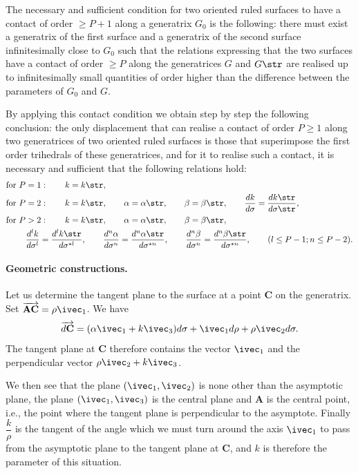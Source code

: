 The necessary and sufficient condition for two oriented ruled surfaces to have a contact of order $\ge P+1$ along a generatrix $G_{0}$ is the following: there must exist a generatrix of the first surface and a generatrix of the second surface infinitesimally close to $G_{0}$ such that the relations expressing that the two surfaces have a contact of order $\ge P$ along the generatrices $G$ and $G\str$ are realised up to infinitesimally small quantities of order higher than the difference between the parameters of $G_{0}$ and $G$.

By applying this contact condition we obtain step by step the following conclusion: the only displacement that can realise a contact of order $P\ge 1$ along two generatrices of two oriented ruled surfaces is those that superimpose the first order trihedrals of these generatrices, and for it to realise such a contact, it is necessary and sufficient that the following relations hold:
\begin{align*}
  \text{for }P&=1:\qquad k=k\str,\\
  \text{for }P&=2:\qquad k=k\str,\qquad\alpha=\alpha\str,\qquad\beta=\beta\str,\qquad\frac{dk}{d\sigma}=\frac{dk\str}{d\sigma\str},\\
  \text{for }P&>2:\qquad k=k\str,\qquad\alpha=\alpha\str,\qquad\beta=\beta\str,\\
&\frac{d^{l}k}{d\sigma^{l}}=\frac{d^{l}k\str}{d\sigma^{\star l}},\qquad
\frac{d^{n}\alpha}{d\sigma^{n}}=\frac{d^{n}\alpha\str}{d\sigma^{\star n}},\qquad
\frac{d^{n}\beta}{d\sigma^{n}}=\frac{d^{n}\beta\str}{d\sigma^{\star n}},\qquad
(l\le P-1;n\le P-2).
\end{align*}


\paragraph{Geometric constructions.}
\label{sec:48}
Let us determine the tangent plane to the surface at a point $\mathbf{C}$ on the generatrix. Set $\overrightarrow{\mathbf{AC}}=\rho\ivec_{1}$. We have
\[
\overrightarrow{d\mathbf{C}}=(\alpha\ivec_{1}+k\ivec_{3})d\sigma+\ivec_{1}d\rho+\rho\ivec_{2}d\sigma.
\]
The tangent plane at $\mathbf{C}$ therefore contains the vector $\ivec_{1}$ and the perpendicular vector $\rho\ivec_{2}+k\ivec_{3}$.

We then see that the plane $(\ivec_{1},\ivec_{2})$ is none other than the asymptotic plane, the plane $(\ivec_{1},\ivec_{3})$ is the central plane and $\mathbf{A}$ is the central point, i.e., the point where the tangent plane is perpendicular to the asymptote. Finally $\dfrac{k}{\rho}$ is the tangent of the angle which we must turn around the axis $\ivec_{1}$ to pass from the asymptotic plane to the tangent plane at $\mathbf{C}$, and $k$ is therefore the parameter of this situation.

